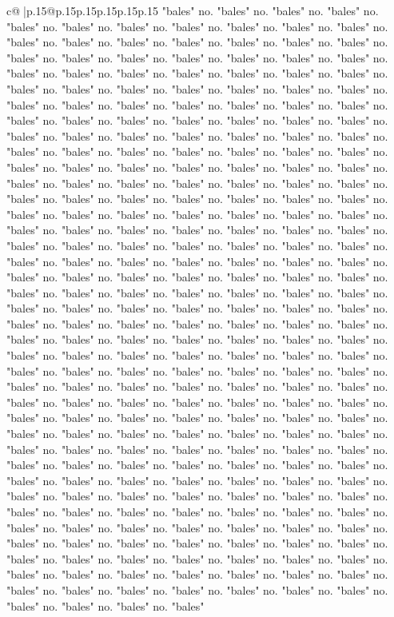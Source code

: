 \documentclass{article}
\begin{document}
{\begin{supertabular}{c@{$\;$}|p{.15\linewidth}@{}p{.15\linewidth}p{.15\linewidth}p{.15\linewidth}p{.15\linewidth}p{.15\linewidth}}
{{{"bales" no. "bales" no. "bales" no. "bales" no. "bales" no. "bales" no. "bales" no. "bales" no. "bales" no. "bales" no. "bales" no. "bales" no. "bales" no. "bales" no. "bales" no. "bales" no. "bales" no. "bales" no. "bales" no. "bales" no. "bales" no. "bales" no. "bales" no. "bales" no. "bales" no. "bales" no. "bales" no. "bales" no. "bales" no. "bales" no. "bales" no. "bales" no. "bales" no. "bales" no. "bales" no. "bales" no. "bales" no. "bales" no. "bales" no. "bales" no. "bales" no. "bales" no. "bales" no. "bales" no. "bales" no. "bales" no. "bales" no. "bales" no. "bales" no. "bales" no. "bales" no. "bales" no. "bales" no. "bales" no. "bales" no. "bales" no. "bales" no. "bales" no. "bales" no. "bales" no. "bales" no. "bales" no. "bales" no. "bales" no. "bales" no. "bales" no. "bales" no. "bales" no. "bales" no. "bales" no. "bales" no. "bales" no. "bales" no. "bales" no. "bales" no. "bales" no. "bales" no. "bales" no. "bales" no. "bales" no. "bales" no. "bales" no. "bales" no. "bales" no. "bales" no. "bales" no. "bales" no. "bales" no. "bales" no. "bales" no. "bales" no. "bales" no. "bales" no. "bales" no. "bales" no. "bales" no. "bales" no. "bales" no. "bales" no. "bales" no. "bales" no. "bales" no. "bales" no. "bales" no. "bales" no. "bales" no. "bales" no. "bales" no. "bales" no. "bales" no. "bales" no. "bales" no. "bales" no. "bales" no. "bales" no. "bales" no. "bales" no. "bales" no. "bales" no. "bales" no. "bales" no. "bales" no. "bales" no. "bales" no. "bales" no. "bales" no. "bales" no. "bales" no. "bales" no. "bales" no. "bales" no. "bales" no. "bales" no. "bales" no. "bales" no. "bales" no. "bales" no. "bales" no. "bales" no. "bales" no. "bales" no. "bales" no. "bales" no. "bales" no. "bales" no. "bales" no. "bales" no. "bales" no. "bales" no. "bales" no. "bales" no. "bales" no. "bales" no. "bales" no. "bales" no. "bales" no. "bales" no. "bales" no. "bales" no. "bales" no. "bales" no. "bales" no. "bales" no. "bales" no. "bales" no. "bales" no. "bales" no. "bales" no. "bales" no. "bales" no. "bales" no. "bales" no. "bales" no. "bales" no. "bales" no. "bales" no. "bales" no. "bales" no. "bales" no. "bales" no. "bales" no. "bales" no. "bales" no. "bales" no. "bales" no. "bales" no. "bales" no. "bales" no. "bales" no. "bales" no. "bales" no. "bales" no. "bales" no. "bales" no. "bales" no. "bales" no. "bales" no. "bales" no. "bales" no. "bales" no. "bales" no. "bales" no. "bales" no. "bales" no. "bales" no. "bales" no. "bales" no. "bales" no. "bales" no. "bales" no. "bales" no. "bales" no. "bales" no. "bales" no. "bales" no. "bales" no. "bales" no. "bales" no. "bales" no. "bales" no. "bales" no. "bales" no. "bales" no. "bales" no. "bales" no. "bales" no. "bales" no. "bales" no. "bales" no. "bales" no. "bales" no. "bales" no. "bales" no. "bales" no. "bales" no. "bales" no. "bales" no. "bales" no. "bales" no. "bales" no. "bales" no. "bales" no. "bales" no. "bales" no. "bales" no. "bales" no. "bales" no. "bales" no. "bales" no. "bales" no. "bales" no. "bales" no. "bales" no. "bales" no. "bales" no. "bales" no. "bales" no. "bales" no. "bales" no. "bales" no. "bales" no. "bales" no. "bales" no. "bales" no. "bales" no. "bales" no. "bales" }}}
\end{supertabular}}
\end{document}
